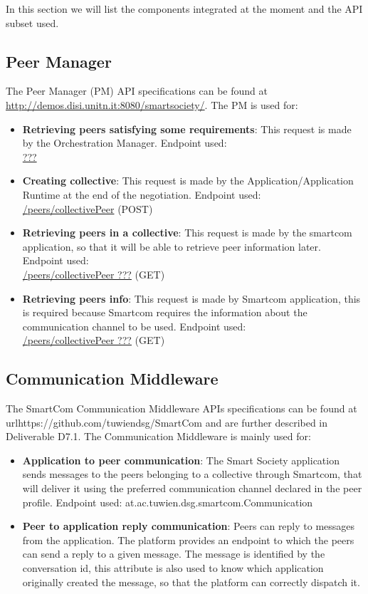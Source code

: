 In this section we will list the components integrated at the moment and the API subset used.

\subsection{Peer Manager}
The Peer Manager (PM) API specifications can be found at \url{http://demos.disi.unitn.it:8080/smartsociety/}. The PM is used for:
\begin{itemize}
\item {\bf Retrieving peers satisfying some requirements}: This request is made by the Orchestration Manager. Endpoint used:\\
	\url{???}
\item {\bf Creating collective}: This request is made by the Application/Application Runtime at the end of the negotiation. Endpoint used:\\
	\url{/peers/collectivePeer} (\textsc{POST})
\item {\bf Retrieving peers in a collective}: This request is made by the smartcom application, so that it will be able to retrieve peer information later. Endpoint used:\\
	\url{/peers/collectivePeer ???} (\textsc{GET})
\item {\bf Retrieving peers info}: This request is made by Smartcom application, this is required because Smartcom requires the information about the communication channel to be used. Endpoint used:\\
	\url{/peers/collectivePeer ???} (\textsc{GET})	
\end{itemize}


\subsection{Communication Middleware}
The SmartCom Communication Middleware APIs specifications can be found at 
url{https://github.com/tuwiendsg/SmartCom} and are further described in Deliverable D7.1. The Communication Middleware is mainly used for:
\begin{itemize}
\item {\bf Application to peer communication}: The Smart Society application sends messages to the peers belonging to a collective through Smartcom, that will deliver it using the preferred communication channel declared in the peer profile. Endpoint used: {at.ac.tuwien.dsg.smartcom.Communication}
\item {\bf Peer to application reply communication}: Peers can reply to messages from the application. The platform provides an endpoint to which the peers can send a reply to a given message. The message is identified by the conversation id, this attribute is also used to know which application
originally created the message, so that the platform can correctly dispatch it. 
\end{itemize}


